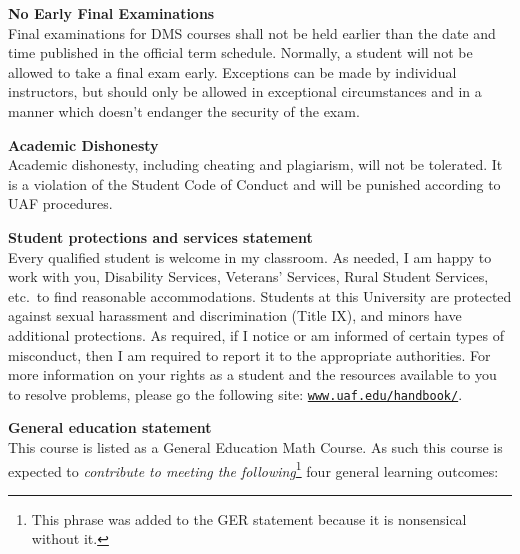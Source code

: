 \documentclass[12pt]{article}
\renewcommand{\emph}[1]{\textsf{\textbf{#1}}}
\newcommand{\localhead}[1]{\par\smallskip\textbf{#1} \smallskip\nobreak\\}%
\def\subheading#1{\localhead{\emph{#1}}}
\begin{document}
\subheading{No Early Final Examinations}
Final examinations for DMS
  courses shall not be held earlier than the date and time published
  in the official term schedule. Normally, a student will not be
  allowed to take a final exam early. Exceptions can be made by
  individual instructors, but should only be allowed in exceptional
  circumstances and in a manner which doesn't endanger the security of
  the exam.

\subheading{Academic Dishonesty}
Academic dishonesty, including cheating and plagiarism, will not
be tolerated.  It is a violation of the Student Code of Conduct
and will be punished according to UAF procedures.


\subheading{Student protections and services statement}
Every qualified student is welcome in my classroom.  As needed, I am happy to work with you, Disability Services, Veterans' Services, Rural Student Services, etc.~to find reasonable accommodations.  Students at this University are protected against sexual harassment and discrimination (Title IX), and minors have additional protections.  As required, if I notice or am informed of certain types of misconduct, then I am required to report it to the appropriate authorities.  For more information on your rights as a student and the resources available to you to resolve problems, please go the following site: \href{https://www.uaf.edu/handbook/}{\texttt{www.uaf.edu/handbook/}}.


\subheading{General education statement}
This course is listed as a General Education Math Course.  As such this course is expected to \textsl{contribute to meeting the following}\footnote{This phrase was added to the GER statement because it is nonsensical without it.} four general learning outcomes:
\end{document}
